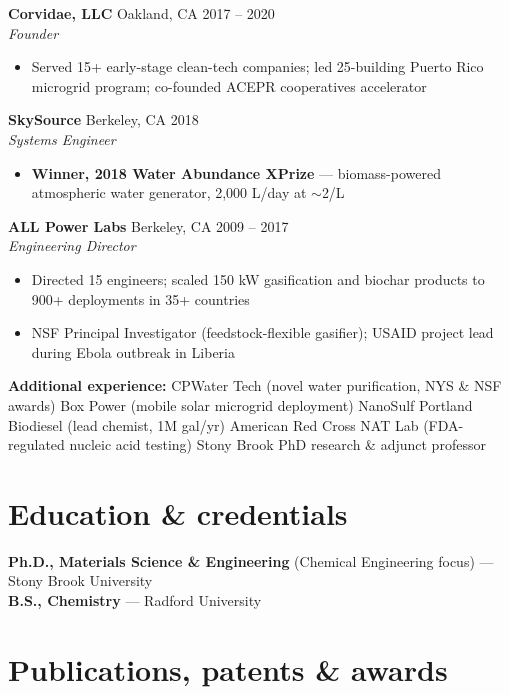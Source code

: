 \documentclass[10pt,letterpaper]{article}
\begin{document}
\noindent\textbf{Corvidae, LLC} \hfill Oakland, CA \textbar{} 2017 -- 2020\\
\textit{Founder}
\begin{itemize}[nosep, leftmargin=1.2em, topsep=2pt]
  \item Served 15+ early-stage clean-tech companies; led 25-building Puerto Rico microgrid program; co-founded ACEPR cooperatives accelerator
\end{itemize}

\noindent\textbf{SkySource} \hfill Berkeley, CA \textbar{} 2018\\
\textit{Systems Engineer}
\begin{itemize}[nosep, leftmargin=1.2em, topsep=2pt]
  \item \textbf{Winner, 2018 Water Abundance XPrize} --- biomass-powered atmospheric water generator, 2,000 L/day at $\sim$2\textcent/L
\end{itemize}

\noindent\textbf{ALL Power Labs} \hfill Berkeley, CA \textbar{} 2009 -- 2017\\
\textit{Engineering Director}
\begin{itemize}[nosep, leftmargin=1.2em, topsep=2pt]
  \item Directed 15 engineers; scaled 150 kW gasification and biochar products to 900+ deployments in 35+ countries
  \item NSF Principal Investigator (feedstock-flexible gasifier); USAID project lead during Ebola outbreak in Liberia
\end{itemize}

\noindent\textbf{Additional experience:} CPWater Tech (novel water purification, NYS \& NSF awards) \textbullet{} Box Power (mobile solar microgrid deployment) \textbullet{} NanoSulf \textbullet{} Portland Biodiesel (lead chemist, 1M gal/yr) \textbullet{} American Red Cross NAT Lab (FDA-regulated nucleic acid testing) \textbullet{} Stony Brook PhD research \& adjunct professor

\section{Education \& credentials}

\textbf{Ph.D., Materials Science \& Engineering} (Chemical Engineering focus) --- Stony Brook University\\
\textbf{B.S., Chemistry} --- Radford University

\section{Publications, patents \& awards}
\end{document}
